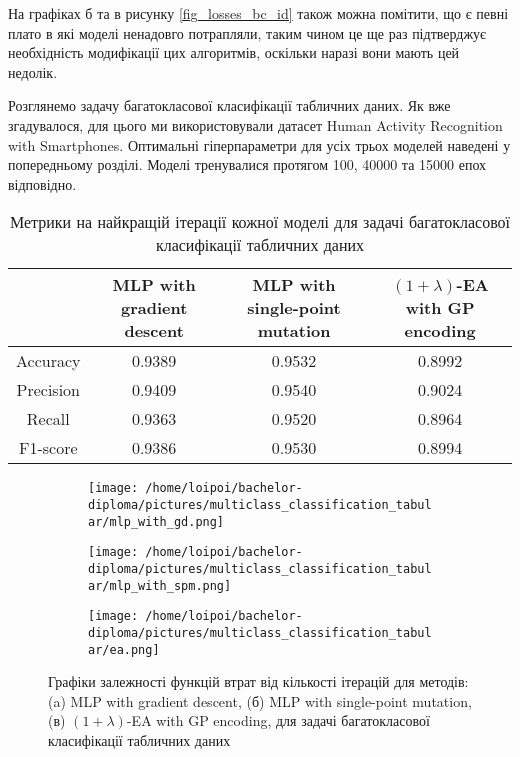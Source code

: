 На графіках б та в рисунку \ref{fig_losses_bc_id} також можна помітити, що є певні плато в які моделі ненадовго потрапляли, таким чином це ще раз підтверджує необхідність модифікації цих алгоритмів, оскільки наразі вони мають цей недолік.

Розглянемо задачу багатокласової класифікації табличних даних. Як вже згадувалося, для цього ми використовували датасет Human Activity Recognition with Smartphones. Оптимальні гіперпараметри для усіх трьох моделей наведені у попередньому розділі. Моделі тренувалися протягом 100, 40000 та 15000 епох відповідно.

\begin{table}[ht]
	\centering
	\begin{adjustbox}{max width=\textwidth}
		\begin{tabular}{|c|c|c|c|}
			\hline 
			& MLP with gradient descent & MLP with single-point mutation & $(1+\lambda)$-EA with GP encoding \\
			\hline 
			Accuracy & 0.9389 & 0.9532 & 0.8992 \\
			\hline 
			Precision & 0.9409 & 0.9540 & 0.9024 \\
			\hline
			Recall & 0.9363 & 0.9520 & 0.8964 \\
			\hline
			F1-score & 0.9386 & 0.9530 & 0.8994 \\
			\hline
		\end{tabular}
	\end{adjustbox}
	\caption{Метрики на найкращій ітерації кожної моделі для задачі багатокласової класифікації табличних даних}
	\label{metrics_mc_td_results}
\end{table}

\begin{figure}[ht]
	\centering
	\begin{subfigure}[b]{0.32\textwidth}    
		\texttt{[image: /home/loipoi/bachelor-diploma/pictures/multiclass\_classification\_tabular/mlp\_with\_gd.png]}
		\caption{}
	\end{subfigure}	
	\begin{subfigure}[b]{0.32\textwidth}
		\texttt{[image: /home/loipoi/bachelor-diploma/pictures/multiclass\_classification\_tabular/mlp\_with\_spm.png]}
		\caption{}
	\end{subfigure}	
	\begin{subfigure}[b]{0.32\textwidth}
		\texttt{[image: /home/loipoi/bachelor-diploma/pictures/multiclass\_classification\_tabular/ea.png]}
		\caption{}
	\end{subfigure}
	
	\caption{Графіки залежності функцій втрат від кількості ітерацій для методів: (a) MLP with gradient descent, (б) MLP with single-point mutation, (в) $(1+\lambda)$-EA with GP encoding, для задачі багатокласової класифікації табличних даних}
	\label{fig_losses_mc_td}
\end{figure}

